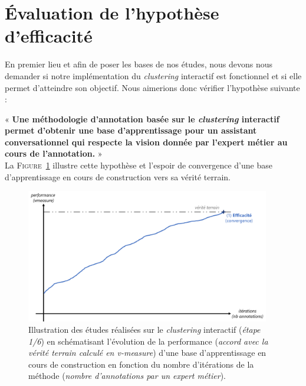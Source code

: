 \section{Évaluation de l'hypothèse d'efficacité}
\label{section:4.1-HYPOTHESE-EFFICACITE}

	En premier lieu et afin de poser les bases de nos études, nous devons nous demander si notre implémentation du \textit{clustering} interactif est fonctionnel et si elle permet d'atteindre son objectif.
	Nous aimerions donc vérifier l'hypothèse suivante :
	

	\begin{tcolorbox}[
		title=\faVial~\textbf{Hypothèse d'efficacité}~\faVial,
		colback=colorTcolorboxHypothesis!15,
		colframe=colorTcolorboxHypothesis!75,
		width=\linewidth
	]
		« \textbf{
			Une méthodologie d'annotation basée sur le \textit{clustering} interactif permet d'obtenir une base d'apprentissage pour un assistant conversationnel qui respecte la vision donnée par l'expert métier au cours de l'annotation.
		} » \\
		
		La \textsc{Figure~\ref{figure:4.1-HYPOTHESE-EFFICACITE}} illustre cette hypothèse et l'espoir de convergence d'une base d'apprentissage en cours de construction vers sa vérité terrain.
		\begin{figure}[H]  %
			\centering
			\includegraphics[width=0.95\textwidth]{figures/hypotheses-01-efficacite}
			\caption{Illustration des études réalisées sur le \textit{clustering} interactif (\textit{étape 1/6}) en schématisant l'évolution de la performance (\textit{accord avec la vérité terrain calculé en v-measure}) d'une base d'apprentissage en cours de construction en fonction du nombre d'itérations de la méthode (\textit{nombre d'annotations par un expert métier}).}
			\label{figure:4.1-HYPOTHESE-EFFICACITE}
		\end{figure}

	\end{tcolorbox}
		
